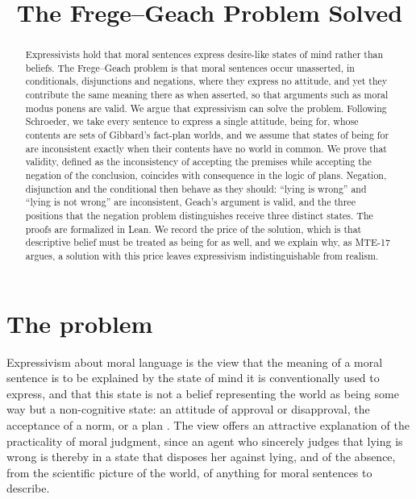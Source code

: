 \documentclass{situationist-preprint}
\title{The Frege--Geach Problem Solved}
\begin{document}
\maketitle

\begin{abstract}
Expressivists hold that moral sentences express desire-like states of mind rather than beliefs. The Frege--Geach problem is that moral sentences occur unasserted, in conditionals, disjunctions and negations, where they express no attitude, and yet they contribute the same meaning there as when asserted, so that arguments such as moral modus ponens are valid. We argue that expressivism can solve the problem. Following Schroeder, we take every sentence to express a single attitude, being for, whose contents are sets of Gibbard's fact-plan worlds, and we assume that states of being for are inconsistent exactly when their contents have no world in common. We prove that validity, defined as the inconsistency of accepting the premises while accepting the negation of the conclusion, coincides with consequence in the logic of plans. Negation, disjunction and the conditional then behave as they should: \enquote{lying is wrong} and \enquote{lying is not wrong} are inconsistent, Geach's argument is valid, and the three positions that the negation problem distinguishes receive three distinct states. The proofs are formalized in Lean. We record the price of the solution, which is that descriptive belief must be treated as being for as well, and we explain why, as MTE-17 argues, a solution with this price leaves expressivism indistinguishable from realism.
\end{abstract}

\section{The problem}

Expressivism about moral language is the view that the meaning of a moral sentence is to be explained by the state of mind it is conventionally used to express, and that this state is not a belief representing the world as being some way but a non-cognitive state: an attitude of approval or disapproval, the acceptance of a norm, or a plan \citep{Ayer1936,Stevenson1944,Hare1952,Blackburn1984,Gibbard1990,Gibbard2003}. The view offers an attractive explanation of the practicality of moral judgment, since an agent who sincerely judges that lying is wrong is thereby in a state that disposes her against lying, and of the absence, from the scientific picture of the world, of anything for moral sentences to describe.
\end{document}
